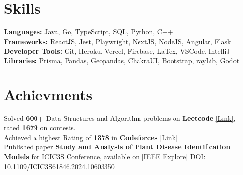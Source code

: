 \documentclass[]{Nikhil_Kadiyan_Resume}
\begin{document}


\section{Skills} 
\hrulefill

\pt \textbf{Languages:} Java, Go, TypeScript, SQL, Python, C++  \\
\pt \textbf{Frameworks:} ReactJS, Jest, Playwright, NextJS, NodeJS, Angular, Flask\\
\pt \textbf{Developer Tools:}  Git, Heroku, Vercel, Firebase, LaTex, VSCode, IntelliJ\\
\pt \textbf{Libraries:} Prisma, Pandas, Geopandas, ChakraUI, Bootstrap, rayLib, Godot\\

\sectionsep

\section{Achievments} 
\hrulefill

\pt Solved \textbf{600+} Data Structures and Algorithm problems on \textbf{Leetcode} \href{https://leetcode.com/anidnottaken/}{[Link]}, rated \textbf{1679} on contests.\\ 
\pt Achieved a highest Rating of \textbf{1378} in \textbf{Codeforces} \href{https://codeforces.com/profile/nikhilcad}{[Link]} \\
\pt Published paper \textbf{Study and Analysis of Plant Disease Identification Models} for ICIC3S Conference, available on \href{https://ieeexplore.ieee.org/document/10603350}{[IEEE Explore]} DOI: 10.1109/ICIC3S61846.2024.10603350\\
\end{document}
